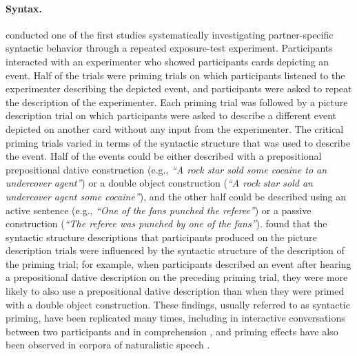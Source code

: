\paragraph{Syntax.} \textcite{Bock1986} conducted one of the first studies systematically investigating partner-specific syntactic behavior through a repeated
exposure-test experiment. Participants interacted with an experimenter who showed participants cards depicting an event.  Half of the trials were priming trials on which
 participants listened to the experimenter describing the depicted event, and participants were asked to repeat the description of the experimenter. 
 Each priming trial was followed by a picture description trial on which participants were asked to describe a different event depicted on another card without any input from the experimenter.
The critical priming trials varied in terms of the syntactic structure that was used to describe the event. Half of the events could be either described with a prepositional
 prepositional dative construction (e.g., \textit{``A rock star
sold some cocaine to an undercover agent''})  or a double object construction (\textit{``A rock star sold an undercover agent some cocaine''}), and the other half could be
described using an active sentence (e.g., \textit{``One of the fans punched the referee''}) or a passive construction (\textit{``The referee was punched by one of the fans''}).
\textcite{Bock1986} found that the syntactic structure descriptions that participants produced on the picture description trials were influenced by the syntactic structure of the description
of the priming trial; for example, when participants described an event after hearing a prepositional dative description on the preceding priming trial, they were more likely to also 
use a prepositional dative description than when they were primed with a double object construction. These findings, usually referred to as syntactic priming, have been 
replicated many times, including in interactive conversations between two participants \cite{Branigan2000} and in comprehension , 
and priming effects have also been observed in corpora of naturalistic speech . 

